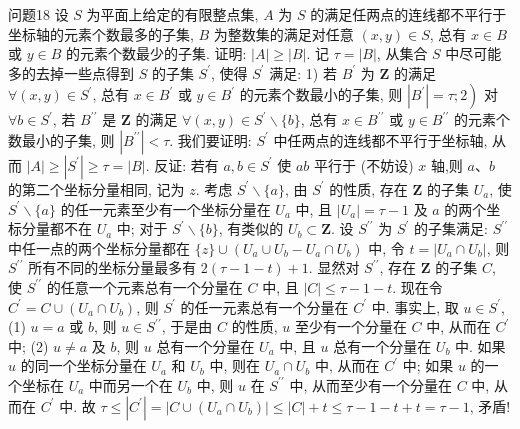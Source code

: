 问题18 设 $S$ 为平面上给定的有限整点集, $A$ 为 $S$ 的满足任两点的连线都不平行于坐标轴的元素个数最多的子集, $B$ 为整数集的满足对任意 $(x, y) \in S$, 总有 $x \in B$ 或 $y \in B$ 的元素个数最少的子集.
证明: $|A| \geqslant|B|$.
记 $\tau=|B|$, 从集合 $S$ 中尽可能多的去掉一些点得到 $S$ 的子集 $S^{\prime}$, 使得 $S^{\prime}$ 满足: 1) 若 $B^{\prime}$ 为 $\mathbf{Z}$ 的满足 $\forall(x, y) \in S^{\prime}$, 总有 $x \in B^{\prime}$ 或 $y \in B^{\prime}$ 的元素个数最小的子集, 则 $\left.\left|B^{\prime}\right|=\tau ; 2\right)$ 对 $\forall b \in S^{\prime}$, 若 $B^{\prime \prime}$ 是 $\mathbf{Z}$ 的满足 $\forall(x, y) \in S^{\prime} \backslash\{b\}$, 总有 $x \in B^{\prime \prime}$ 或 $y \in B^{\prime \prime}$ 的元素个数最小的子集, 则 $\left|B^{\prime \prime}\right|<\tau$. 我们要证明: $S^{\prime}$ 中任两点的连线都不平行于坐标轴, 从而 $|A| \geqslant\left|S^{\prime}\right| \geqslant \tau= |B|$.
反证: 若有 $a, b \in S^{\prime}$ 使 $a b$ 平行于 (不妨设) $x$ 轴,则 $a 、 b$ 的第二个坐标分量相同, 记为 $z$. 考虑 $S^{\prime} \backslash\{a\}$, 由 $S^{\prime}$ 的性质, 存在 $\mathbf{Z}$ 的子集 $U_a$, 使 $S^{\prime} \backslash\{a\}$ 的任一元素至少有一个坐标分量在 $U_a$ 中, 且 $\left|U_a\right|=\tau-1$ 及 $a$ 的两个坐标分量都不在 $U_a$ 中; 对于 $S^{\prime} \backslash\{b\}$, 有类似的 $U_b \subset \mathbf{Z}$. 设 $S^{\prime \prime}$ 为 $S^{\prime}$ 的子集满足: $S^{\prime \prime}$ 中任一点的两个坐标分量都在 $\{z\} \cup\left(U_a \cup U_b-U_a \cap U_b\right)$ 中, 令 $t=\left|U_a \cap U_b\right|$, 则 $S^{\prime \prime}$ 所有不同的坐标分量最多有 $2(\tau-1-t)+1$. 显然对 $S^{\prime \prime}$, 存在 $\mathbf{Z}$ 的子集 $C$, 使 $S^{\prime \prime}$ 的任意一个元素总有一个分量在 $C$ 中, 且 $|C| \leqslant \tau-1-t$.
现在令 $C^{\prime}=C \cup\left(U_a \cap U_b\right)$, 则 $S^{\prime}$ 的任一元素总有一个分量在 $C^{\prime}$ 中.
事实上, 取 $u \in S^{\prime}$, (1) $u=a$ 或 $b$, 则 $u \in S^{\prime \prime}$, 于是由 $C$ 的性质, $u$ 至少有一个分量在 $C$ 中, 从而在 $C^{\prime}$ 中; (2) $u \neq a$ 及 $b$, 则 $u$ 总有一个分量在 $U_a$ 中, 且 $u$ 总有一个分量在 $U_b$ 中.
如果 $u$ 的同一个坐标分量在 $U_a$ 和 $U_b$ 中, 则在 $U_a \cap U_b$ 中, 从而在 $C^{\prime}$ 中; 如果 $u$ 的一个坐标在 $U_a$ 中而另一个在 $U_b$ 中, 则 $u$ 在 $S^{\prime \prime}$ 中, 从而至少有一个分量在 $C$ 中, 从而在 $C^{\prime}$ 中.
故 $\tau \leqslant\left|C^{\prime}\right|=\left|C \cup\left(U_a \cap U_b\right)\right| \leqslant |C|+t \leqslant \tau-1-t+t=\tau-1$, 矛盾!


